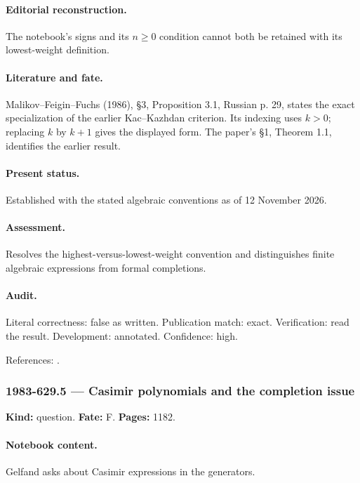 \paragraph{Editorial reconstruction.} The notebook’s signs and its \(n\ge0\) condition cannot both be retained with its lowest-weight definition.

\paragraph{Literature and fate.} Malikov–Feigin–Fuchs (1986), \S3, Proposition 3.1, Russian p. 29, states the exact specialization of the earlier Kac–Kazhdan criterion. Its indexing uses \(k>0\); replacing \(k\) by \(k+1\) gives the displayed form. The paper’s \S1, Theorem 1.1, identifies the earlier result.

\paragraph{Present status.} Established with the stated algebraic conventions as of 12 November 2026.

\paragraph{Assessment.} Resolves the highest-versus-lowest-weight convention and distinguishes finite algebraic expressions from formal completions.

\paragraph{Audit.} Literal correctness: false as written. Publication match: exact. Verification: read the result. Development: annotated. Confidence: high.

\noindent References: \citep{malikovfeiginfuchs1986singular}.\par

\subsubsection{1983-629.5 --- Casimir polynomials and the completion issue}

\label{item:1983-629.5}

\noindent\textbf{Kind:} question. \textbf{Fate:} F. \textbf{Pages:} 1182.\par

\paragraph{Notebook content.} Gelfand asks about Casimir expressions in the generators.

